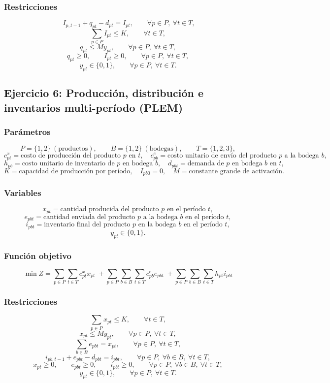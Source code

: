 \documentclass[12pt,letterpaper]{article}
\begin{document}
\subsubsection*{Restricciones}
\[
\;I_{p,t-1}+q_{pt}-d_{pt}=I_{pt},\qquad \forall p\in P,\ \forall t\in T,
\]
\[
\sum_{p\in P}I_{pt}\le K,\qquad \forall t\in T,
\]
\[
q_{pt}\le M y_{pt},\qquad \forall p\in P,\ \forall t\in T,
\]
\[
q_{pt}\ge 0,\qquad I_{pt}\ge 0,\qquad \forall p\in P,\ \forall t\in T,
\]
\[
y_{pt}\in\{0,1\},\qquad \forall p\in P,\ \forall t\in T.
\]

\subsection{Ejercicio 6: Producción, distribución e inventarios multi-período (PLEM)}

\subsubsection*{Parámetros}
\[
P=\{1,2\}\ (\text{productos}),\qquad
B=\{1,2\}\ (\text{bodegas}),\qquad
T=\{1,2,3\},
\]
\[
c^x_{pt}=\text{costo de producción del producto } p \text{ en } t,\quad
c^e_{pb}=\text{costo unitario de envío del producto } p \text{ a la bodega } b,
\]
\[
h_{pb}=\text{costo unitario de inventario de } p \text{ en bodega } b,\quad
d_{pbt}=\text{demanda de } p \text{ en bodega } b \text{ en } t,
\]
\[
K=\text{capacidad de producción por período},\quad
I_{pb0}=0,\quad
M=\text{constante grande de activación}.
\]

\subsubsection*{Variables}
\[
x_{pt}=\text{cantidad producida del producto } p \text{ en el período } t,
\]
\[
e_{pbt}=\text{cantidad enviada del producto } p \text{ a la bodega } b \text{ en el período } t,
\]
\[
i_{pbt}=\text{inventario final del producto } p \text{ en la bodega } b \text{ en el período } t,
\]
\[
y_{pt}\in\{0,1\}.
\]

\subsubsection*{Función objetivo}
\[
\min Z=
\sum_{p\in P}\sum_{t\in T}c^x_{pt}x_{pt}
\;+\sum_{p\in P}\sum_{b\in B}\sum_{t\in T}c^e_{pb}e_{pbt}
\;+\sum_{p\in P}\sum_{b\in B}\sum_{t\in T}h_{pb}i_{pbt}
\]

\subsubsection*{Restricciones}
\[
\sum_{p\in P}x_{pt}\le K,\qquad \forall t\in T,
\]
\[
x_{pt}\le M y_{pt},\qquad \forall p\in P,\ \forall t\in T,
\]
\[
\sum_{b\in B}e_{pbt}=x_{pt},\qquad \forall p\in P,\ \forall t\in T,
\]
\[
i_{pb,t-1}+e_{pbt}-d_{pbt}=i_{pbt},\qquad \forall p\in P,\ \forall b\in B,\ \forall t\in T,
\]
\[
x_{pt}\ge 0,\qquad e_{pbt}\ge 0,\qquad i_{pbt}\ge 0,\qquad \forall p\in P,\ \forall b\in B,\ \forall t\in T,
\]
\[
y_{pt}\in\{0,1\},\qquad \forall p\in P,\ \forall t\in T.
\]
\end{document}
